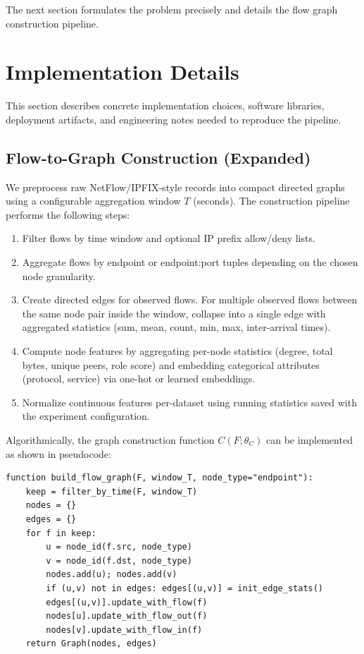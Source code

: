 \documentclass[conference]{IEEEtran}
\begin{document}
The next section formulates the problem precisely and details the flow graph construction pipeline.

\section{Implementation Details}

This section describes concrete implementation choices, software libraries, deployment artifacts, and engineering notes needed to reproduce the pipeline.

\subsection{Flow-to-Graph Construction (Expanded)}

We preprocess raw NetFlow/IPFIX-style records into compact directed graphs using a configurable aggregation window $T$ (seconds). The construction pipeline performs the following steps:

\begin{enumerate}
	\item Filter flows by time window and optional IP prefix allow/deny lists.
	\item Aggregate flows by endpoint or endpoint:port tuples depending on the chosen node granularity.
	\item Create directed edges for observed flows. For multiple observed flows between the same node pair inside the window, collapse into a single edge with aggregated statistics (sum, mean, count, min, max, inter-arrival times).
	\item Compute node features by aggregating per-node statistics (degree, total bytes, unique peers, role score) and embedding categorical attributes (protocol, service) via one-hot or learned embeddings.
	\item Normalize continuous features per-dataset using running statistics saved with the experiment configuration.
\end{enumerate}

Algorithmically, the graph construction function $C(F;\theta_C)$ can be implemented as shown in pseudocode:

\begin{verbatim}
function build_flow_graph(F, window_T, node_type="endpoint"):
	keep = filter_by_time(F, window_T)
	nodes = {}
	edges = {}
	for f in keep:
		u = node_id(f.src, node_type)
		v = node_id(f.dst, node_type)
		nodes.add(u); nodes.add(v)
		if (u,v) not in edges: edges[(u,v)] = init_edge_stats()
		edges[(u,v)].update_with_flow(f)
		nodes[u].update_with_flow_out(f)
		nodes[v].update_with_flow_in(f)
	return Graph(nodes, edges)
\end{verbatim}
\end{document}
